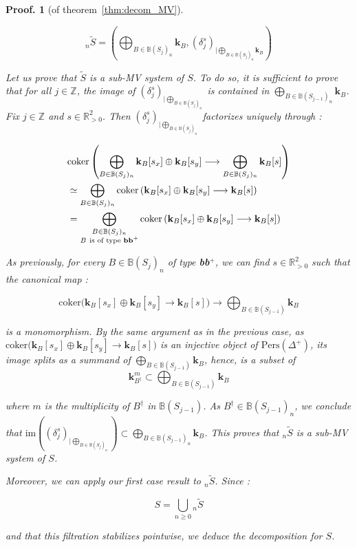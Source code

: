 \documentclass[a4paper, english, 11pt]{article}
\newcommand{\kk}[0]{\textbf{k}}
\newcommand{\0}{\vec{0}}
\newcommand{\R}[0]{\mathbb{R}}
\newcommand{\Z}[0]{\mathbb{Z}}
\newcommand{\Pers}[0]{\text{Pers}}
\newtheorem*{pf}{Proof.} }
\begin{document}
\begin{pf}[of theorem~\ref{thm:decom_MV}]
\begin{itemize}
$${}_n\tilde{S} = \left (\bigoplus_{B\in \mathbb{B}(S_j)_n } \kk_{B}, (\delta_j^s)_{|\bigoplus_{B\in \mathbb{B}(S_j)_n } \kk_{B}} \right )  $$

 Let us prove that $\tilde{S}$ is a sub-MV system of $S$. To do so, it is sufficient to prove that for all $j\in  \Z$, the image of $(\delta_j^s)_{|\bigoplus_{B\in \mathbb{B}(S_j)_n}}$ is contained in $\bigoplus_{B\in \mathbb{B}(S_{j-1})_n } \kk_{B}$. Fix $j\in \Z$ and $s\in \R^2_{>0}$. Then $(\delta_j^s)_{|\bigoplus_{B\in \mathbb{B}(S_j)_n}}$ factorizes uniquely through : 
 
 \begin{align*}
     & \text{coker} \left ( \bigoplus_{B\in \mathbb{B}(S_j)_n } \kk_{B}[s_x] \oplus  \kk_{B} [s_y] \longrightarrow \bigoplus_{B\in \mathbb{B}(S_j)_n } \kk_{B}[s]  \right )   \\ 
     &\simeq \bigoplus_{B\in \mathbb{B}(S_j)_n }  \text{coker} \left ( \kk_{B}[s_x] \oplus  \kk_{B} [s_y] \longrightarrow  \kk_{B}[s] \right ) \\
     &=  \bigoplus_{ \substack{B\in \mathbb{B}(S_j)_n\\ B ~\text{is of type \textbf{bb$^+$}} } } \text{coker} \left ( \kk_{B}[s_x] \oplus  \kk_{B} [s_y] \longrightarrow  \kk_{B}[s] \right ) 
 \end{align*} 
 
As previously, for every $B\in \mathbb{B}(S_j)_n$ of type \textbf{bb$^+$}, we can find $s\in \R^2_{>0}$ such that the canonical map : 

$$ \text{coker} \big ( \kk_{B}[s_x] \oplus  \kk_{B} [s_y] \longrightarrow  \kk_{B}[s] \big  )  \longrightarrow \bigoplus_{B\in \mathbb{B}(S_{j-1}) } \kk_{B} $$

is a monomorphism. By the same argument as in the previous case, as  $ \text{coker} \big ( \kk_{B}[s_x] \oplus  \kk_{B} [s_y] \longrightarrow  \kk_{B}[s] \big  ) $ is an injective object of $\Pers(\Delta^+)$, its image splits as a summand of $\bigoplus_{B\in \mathbb{B}(S_{j-1}) } \kk_{B}$, hence, is a subset of 
$$  \kk_{B^\dag}^m\subset \bigoplus_{B\in \mathbb{B}(S_{j-1}) } \kk_B $$

where $m$ is the multiplicity of $B^\dag$ in $\mathbb{B}(S_{j-1}) $. As $B^\dag\in \mathbb{B}(S_{j-1})_n$, we conclude that $\text{im} ((\delta_j^s)_{|\bigoplus_{B\in \mathbb{B}(S_j)_n}}) \subset \bigoplus_{B\in \mathbb{B}(S_{j-1})_n } \kk_{B} $. This proves that ${}_n\tilde{S}$ is a sub-MV system of $S$.

Moreover, we can apply our first case result to ${}_n\tilde{S}$. Since : 

$$S = \bigcup_{n\geq 0} {}_n\tilde{S} $$

and that this filtration stabilizes pointwise, we deduce the decomposition for $S$.


\end{itemize}

\end{pf}
\end{document}
